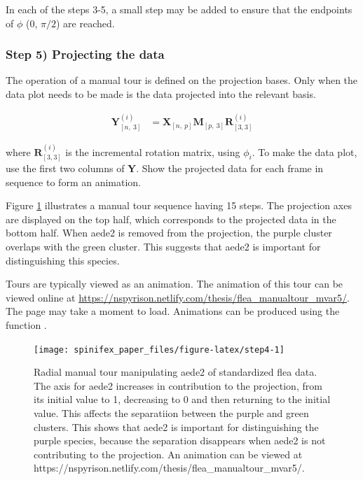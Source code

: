 In each of the steps 3-5, a small step may be added to ensure that the
endpoints of \(\phi\) (\(0\), \(\pi/2\)) are reached.

\hypertarget{sec:display}{%
\subsubsection{Step 5) Projecting the data}\label{sec:display}}

The operation of a manual tour is defined on the projection bases. Only
when the data plot needs to be made is the data projected into the
relevant basis.

\begin{align*}
  \textbf{Y}^{(i)}_{[n,~3]} &= \textbf{X}_{[n,~p]} \textbf{M}_{[p,~3]} \textbf{R}^{(i)}_{[3,3]}
\end{align*}

\noindent where \(\textbf{R}^{(i)}_{[3,3]}\) is the incremental rotation
matrix, using \(\phi_i\). To make the data plot, use the first two
columns of \textbf{Y}. Show the projected data for each frame in
sequence to form an animation.

Figure \ref{fig:step4} illustrates a manual tour sequence having 15
steps. The projection axes are displayed on the top half, which
corresponds to the projected data in the bottom half. When aede2 is
removed from the projection, the purple cluster overlaps with the green
cluster. This suggests that aede2 is important for distinguishing this
species.

Tours are typically viewed as an animation. The animation of this tour
can be viewed online at
\url{https://nspyrison.netlify.com/thesis/flea_manualtour_mvar5/}. The
page may take a moment to load. Animations can be produced using the
function .

\begin{Schunk}
\begin{figure}

{\centering \texttt{[image: spinifex\_paper\_files/figure-latex/step4-1]} 

}

\caption[Radial manual tour manipulating aede2 of standardized flea data]{Radial manual tour manipulating aede2 of standardized flea data. The axis for aede2 increases in contribution to the projection, from its initial value to 1, decreasing to 0 and then returning to the initial value. This affects the separatiion between the purple and green clusters. This shows that aede2 is important for distinguishing the purple species, because the separation disappears when aede2 is not contributing to the projection. An animation can be viewed at https://nspyrison.netlify.com/thesis/flea\_manualtour\_mvar5/.}\label{fig:step4}
\end{figure}
\end{Schunk}

